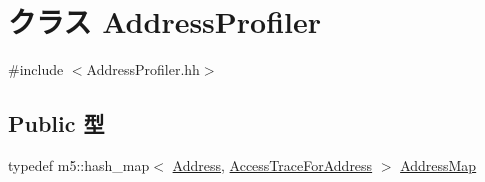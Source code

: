 \hypertarget{classAddressProfiler}{
\section{クラス AddressProfiler}
\label{classAddressProfiler}
}


{\ttfamily \#include $<$AddressProfiler.hh$>$}\subsection*{Public 型}
\begin{DoxyCompactItemize}
\item 
typedef m5::hash\_\-map$<$ \hyperlink{classAddress}{Address}, \hyperlink{classAccessTraceForAddress}{AccessTraceForAddress} $>$ \hyperlink{classAddressProfiler_a8a9f1225b5c1cb2d26e7cea035910b56}{AddressMap}
\end{DoxyCompactItemize}

